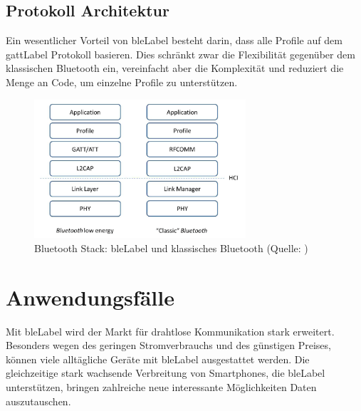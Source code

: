\subsection{Protokoll Architektur}
Ein wesentlicher Vorteil von \gls{bleLabel} besteht darin, dass alle Profile auf dem \gls{gattLabel} Protokoll basieren.
Dies schränkt zwar die Flexibilität gegenüber dem klassischen Bluetooth ein, vereinfacht aber die Komplexität und reduziert die Menge an Code, um einzelne Profile zu unterstützen.
\begin{figure}[H]
	\centering
	\includegraphics[width=0.7\textwidth]{images/ble/bluetooth_stack.png}
	\caption[Bluetooth Stack: \gls{bleLabel} und klassisches Bluetooth]{Bluetooth Stack: \gls{bleLabel} und klassisches Bluetooth (Quelle: \cite[][4]{ti_whitepaper_2015-05-08})}
\end{figure}


\section{Anwendungsfälle}
Mit \gls{bleLabel} wird der Markt für drahtlose Kommunikation stark erweitert.
Besonders wegen des geringen Stromverbrauchs und des günstigen Preises, können viele alltägliche Geräte mit \gls{bleLabel} ausgestattet werden.
Die gleichzeitige stark wachsende Verbreitung von Smartphones, die \gls{bleLabel} unterstützen, bringen zahlreiche neue interessante Möglichkeiten Daten auszutauschen.

